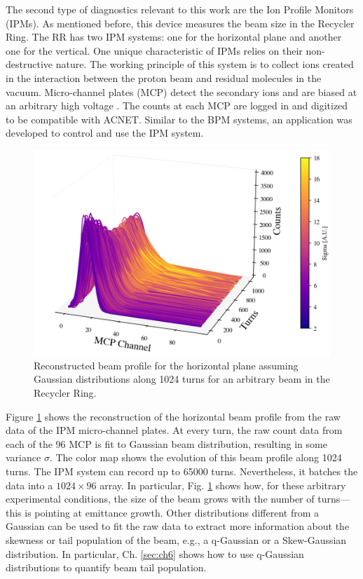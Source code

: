 The second type of diagnostics relevant to this work are the Ion Profile Monitors (IPMs). As mentioned before, this device measures the beam size in the Recycler Ring. The RR has two IPM systems: one for the horizontal plane and another one for the vertical. One unique characteristic of IPMs relies on their non-destructive nature. The working principle of this system is to collect ions created in the interaction between the proton beam and residual molecules in the vacuum. Micro-channel plates (MCP) detect the secondary ions and are biased at an arbitrary high voltage \cite{betiay}. The counts at each MCP are logged in and digitized to be compatible with ACNET. Similar to the BPM systems, an application was developed to control and use the IPM system.     

\begin{figure}[H]
   \centering
   \includegraphics[width=\columnwidth]{chapter3/ipm.png}
   \caption{Reconstructed beam profile for the horizontal plane assuming Gaussian distributions along 1024 turns for an arbitrary beam in the Recycler Ring.}
   \label{fig:ipm0}
\end{figure}

Figure \ref{fig:ipm0} shows the reconstruction of the horizontal beam profile from the raw data of the IPM micro-channel plates. At every turn, the raw count data from each of the 96 MCP is fit to Gaussian beam distribution, resulting in some variance $\sigma$. The color map shows the evolution of this beam profile along 1024 turns. The IPM system can record up to 65000 turns. Nevertheless, it batches the data into a $1024 \times 96$ array. In particular, Fig. \ref{fig:ipm0} shows how, for these arbitrary experimental conditions, the size of the beam grows with the number of turns---this is pointing at emittance growth. Other distributions different from a Gaussian can be used to fit the raw data to extract more information about the skewness or tail population of the beam, e.g., a q-Gaussian or a Skew-Gaussian distribution. In particular, Ch. \ref{sec:ch6} shows how to use q-Gaussian distributions to quantify beam tail population.

